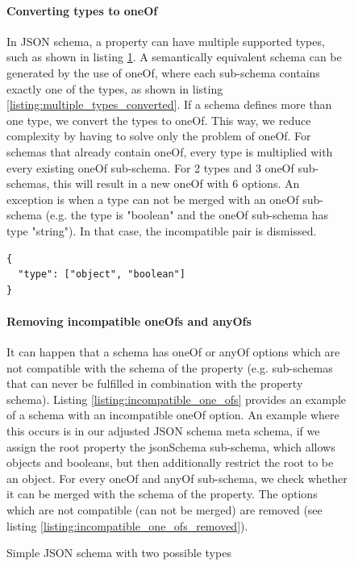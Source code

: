 \begin{figure}[h]
\paragraph{Converting types to oneOf}
In JSON schema, a property can have multiple supported types, such as shown in listing \ref{listing:multiple_types}.
A semantically equivalent schema can be generated by the use of oneOf, where each sub-schema contains exactly one of the types, as shown in listing \ref{listing:multiple_types_converted}.
If a schema defines more than one type, we convert the types to oneOf. This way, we reduce complexity by having to solve only the problem of oneOf.
For schemas that already contain oneOf, every type is multiplied with every existing oneOf sub-schema.
For 2 types and 3 oneOf sub-schemas, this will result in a new oneOf with 6 options.
An exception is when a type can not be merged with an oneOf sub-schema (e.g. the type is "boolean" and the oneOf sub-schema has type "string").
In that case, the incompatible pair is dismissed.

\begin{listing}[!h]
    \begin{verbatim}
{
  "type": ["object", "boolean"]
}
    \end{verbatim}
    \caption{Simple JSON schema with two possible types}
    \label{listing:multiple_types}
\end{listing}



\paragraph{Removing incompatible oneOfs and anyOfs}
It can happen that a schema has oneOf or anyOf options which are not compatible with the schema of the property (e.g. sub-schemas that can never be fulfilled in combination with the property schema).
Listing \ref{listing:incompatible_one_ofs} provides an example of a schema with an incompatible oneOf option.
An example where this occurs is in our adjusted JSON schema meta schema, if we assign the root property the jsonSchema sub-schema, which allows objects and booleans, but then additionally restrict the root to be an object.
For every oneOf and anyOf sub-schema, we check whether it can be merged with the schema of the property.
The options which are not compatible (can not be merged) are removed (see listing \ref{listing:incompatible_one_ofs_removed}).


\end{figure}
